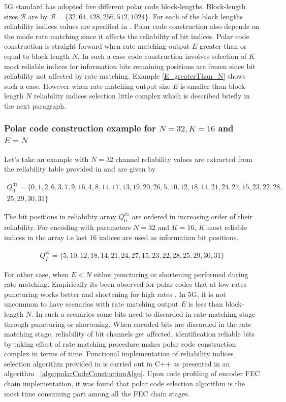 5G standard has adopted five different polar code block-lengths. Block-length sizes $\mathcal{B}$ are by $\mathcal{B} = \{32,64,128,256,512,1024\}$.
For each of the block lengths reliability indices values are specified in \cite{3gpp.38.212}. Polar code construction also depends on the mode rate matching since it affects the reliability of bit indices. Polar code construction is straight forward when rate matching output $E$ greater than or equal to block length $N$, In such a case code construction involves selection of $K$ most reliable indices for information bits remaining positions are frozen since bit reliability not affected by rate matching. Example  \ref{E_greaterThan_N} shows such a case. However when rate matching output size $E$ is smaller than block-length $N$ reliability indices selection little complex which is described briefly in the next paragraph.

\subsubsection*{Polar code construction example for $N = 32, K = 16$ and $E = N$} \label{E_greaterThan_N}
Let's take an example with $N = 32$ channel reliability values are extracted from the reliability table provided in \cite{3gpp.38.212} and are given by

\begin{eqnarray*}
Q_{0}^{31} = \{ 0, 1, 2, 6, 3, 7, 9, 16,4, 8, 11, 17, 13, 19, 20, 26, 5, 10, 12, 18, 14, 21, 24, 27, 15, 23, 22, 28,\\
25, 29, 30, 31 \}
\end{eqnarray*}

The bit positions in reliability array $Q_{0}^{31}$ are ordered in increasing order of their reliability. For encoding with parameters $N = 32$ and $K = 16$, $K$ most reliable indices in the array i.e last 16 indices are used as information bit positions. 

\begin{eqnarray*}
	Q_{\textit{I}}^{\textit{K}} =  \{5, 10, 12, 18, 14, 21, 24, 27, 15, 23, 22, 28,25, 29, 30, 31 \}
\end{eqnarray*} 

For other case, when $E < N$ either puncturing or shortening performed during rate matching. Empirically its been observed for polar codes that at low rates puncturing works better and shortening for high rates \cite{lowcomplexityPuncShorteng}. In 5G, it is not uncommon to have scenarios with rate matching output $E$ is less than block-length $N$. In such a scenarios some bits need to discarded in rate matching stage through puncturing or shortening. When encoded bits are discarded in the rate matching stage, reliability of bit channels get affected, identification reliable bits by taking effect of rate matching procedure makes polar code construction complex in terms of time. Functional implementation of reliability indices selection algorithm provided in \cite{3gpp.38.212} is carried out in C++ as presented in an algorithm ~\ref{algo:polarCodeConstuctionAlgo}. Upon code profiling of encoder FEC chain implementation, it was found that polar code selection algorithm is the most time consuming part among all the FEC chain stages.

